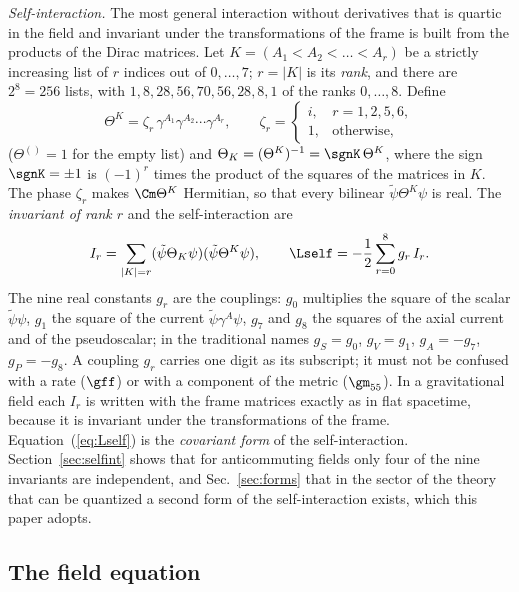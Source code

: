 \emph{Self-interaction.} The most general interaction without derivatives that is quartic in the
field and invariant under the transformations of the frame is built from the products of the Dirac
matrices. Let $K=(A_1<A_2<\dots<A_r)$ be a strictly increasing list of $r$ indices out of
$0,\dots,7$; $r=|K|$ is its \emph{rank}, and there are $2^{8}=256$ lists, with
$1,8,28,56,70,56,28,8,1$ of the ranks $0,\dots,8$. Define
\begin{equation}
\Theta^{K}=\zeta_r\,\gamma^{A_1}\gamma^{A_2}\cdots\gamma^{A_r},\qquad
\zeta_r=\begin{cases}i,&r=1,2,5,6,\\1,&\text{otherwise},\end{cases}
\label{eq:Theta}
\end{equation}
($\Theta^{()}=1$ for the empty list) and $\Theta_K=(\Theta^{K})^{-1}=\sgnK\,\Theta^{K}$, where the
sign $\sgnK=\pm1$ is $(-1)^{r}$ times the product of the squares of the matrices in $K$. The phase
$\zeta_r$ makes $\Cm\Theta^{K}$ Hermitian, so that every bilinear $\tilde\psi\Theta^{K}\psi$ is real.
The \emph{invariant of rank $r$} and the self-interaction are
\begin{equation}
I_r=\sum_{|K|=r}(\tilde\psi\Theta_K\psi)(\tilde\psi\Theta^{K}\psi),\qquad
\Lself=-\frac12\sum_{r=0}^{8}g_r\,I_r .
\label{eq:Lself}
\end{equation}
The nine real constants $g_r$ are the couplings: $g_0$ multiplies the square of the scalar
$\tilde\psi\psi$, $g_1$ the square of the current $\tilde\psi\gamma^{A}\psi$, $g_7$ and $g_8$ the
squares of the axial current and of the pseudoscalar; in the traditional names $g_S=g_0$, $g_V=g_1$,
$g_A=-g_7$, $g_P=-g_8$. A coupling $g_r$ carries one digit as its subscript; it must not be confused
with a rate ($\gff$) or with a component of the metric ($\gm_{55}$). In a gravitational field each
$I_r$ is written with the frame matrices exactly as in flat spacetime, because it is invariant under
the transformations of the frame. Equation~(\ref{eq:Lself}) is the \emph{covariant form} of the
self-interaction. Section~\ref{sec:selfint} shows that for anticommuting fields only four of the nine
invariants are independent, and Sec.~\ref{sec:forms} that in the sector of the theory that can be
quantized a second form of the self-interaction exists, which this paper adopts.

\subsection{The field equation}

